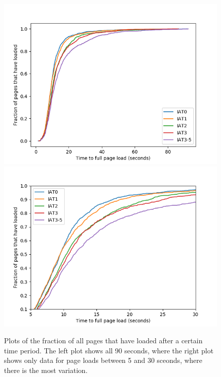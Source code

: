 \documentclass[11pt]{article}
\begin{document}
\begin{figure}[tb]
    \centering
    \includegraphics[scale=.45]{bw-allpages}
    \includegraphics[scale=.45]{bw-allpages-trunc}
    \caption[]{Plots of the fraction of all pages that have loaded after a certain time period. The left plot shows all 90 seconds, where the right plot shows only data for page loads between 5 and 30 sceonds, where there is the most variation.}
\end{figure}
\end{document}
